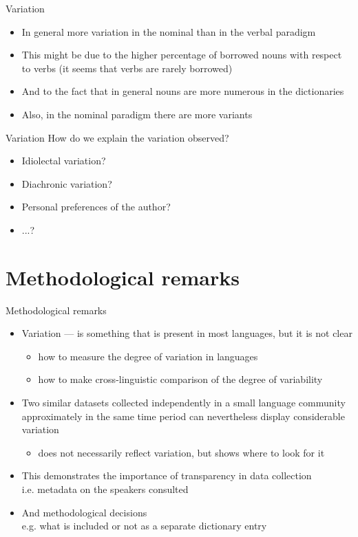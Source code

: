 \begin{frame}{Variation}
\begin{itemize}
    \item In general more variation in the nominal than in the verbal paradigm
    \item This might be due to the higher percentage of borrowed nouns with respect to verbs (it seems that verbs are rarely borrowed)
    \item And to the fact that in general nouns are more numerous in the dictionaries
    \item Also, in the nominal paradigm there are more variants
\end{itemize}
\end{frame}

\begin{frame}{Variation}
How do we explain the variation observed?
\begin{itemize}
    \item Idiolectal variation?
    \item Diachronic variation?
    \item Personal preferences of the author?
    \item ...?
\end{itemize}
\end{frame}

\section{Methodological remarks}
\begin{frame}{Methodological remarks}
\begin{itemize}
    \item Variation --- is something that is present in most languages, but it is not clear
    \begin{itemize}
        \item how to measure the degree of variation in languages
        \item how to make cross-linguistic comparison of the degree of
variability \pause
    \end{itemize}
    \item Two similar datasets collected independently in a small language community approximately in the same time period can nevertheless display considerable variation
    \begin{itemize}
        \item does not necessarily reflect variation, but shows where to look for it
    \end{itemize} 
    \item This demonstrates the importance of transparency in data collection \\ i.e. metadata on the speakers consulted
    \item And methodological decisions \\ e.g. what is included or not as a separate dictionary entry
\end{itemize}

\end{frame}


